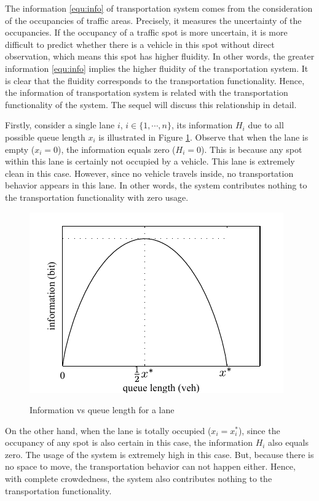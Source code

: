 \documentclass[preprint,authoryear,12pt]{elsarticle}
\begin{document}
The information \eqref{equ:info} of transportation system comes from the consideration of the occupancies of traffic areas. Precisely, it measures the uncertainty of the occupancies. If the occupancy of a traffic spot is more uncertain, it is more difficult to predict whether there is a vehicle in this spot without direct observation, which means this spot has higher fluidity. In other words, the greater information \eqref{equ:info} implies the higher fluidity of the transportation system. It is clear that the fluidity corresponds to the transportation functionality. Hence, the information of transportation system is related with the transportation functionality of the system. The sequel will discuss this relationship in detail.

Firstly, consider a single lane $i$, $i\in\{1,\cdots,n\}$, its information $H_i$ due to all possible queue length $x_i$ is illustrated in Figure \ref{fig:info_lane}. Observe that when the lane is empty ($x_i=0$), the information equals zero ($H_i=0$). This is because any spot within this lane is certainly not occupied by a vehicle. This lane is extremely clean in this case. However, since no vehicle travels inside, no transportation behavior appears in this lane. In other words, the system contributes nothing to the transportation functionality with zero usage.

\begin{figure}[ht]
  \centering
  \includegraphics{pics/lane}\\
  \caption{Information vs queue length for a lane}
  \label{fig:info_lane}
\end{figure}

On the other hand, when the lane is totally occupied ($x_i=x_i^*$), since the occupancy of any spot is also certain in this case, the information $H_i$ also equals zero. The usage of the system is extremely high in this case. But, because there is no space to move, the transportation behavior can not happen either. Hence, with complete crowdedness, the system also contributes nothing to the transportation functionality.
\end{document}
